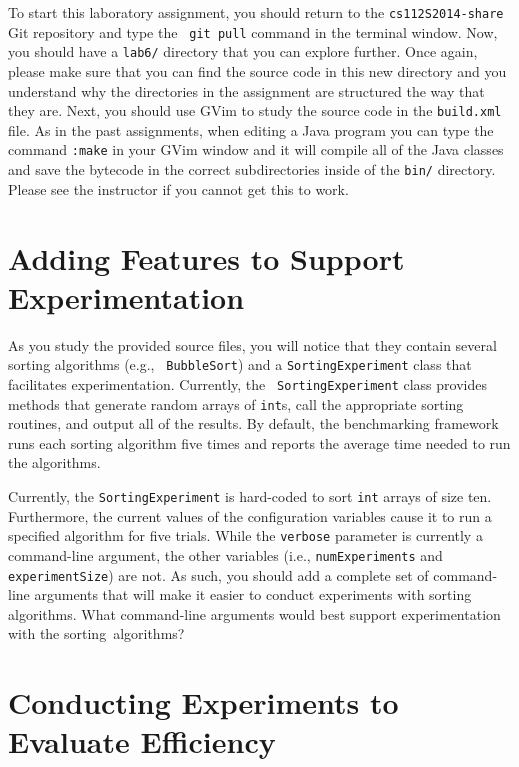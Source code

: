 To start this laboratory assignment, you should return to the {\tt cs112S2014-share} Git repository and type the {\tt
git pull} command in the terminal window.  Now, you should have a {\tt lab6/} directory that you can explore further.
Once again, please make sure that you can find the source code in this new directory and you understand why the
directories in the assignment are structured the way that they are. Next, you should use GVim to study the source code in
the {\tt build.xml} file.  As in the past assignments, when editing a Java program you can type the command {\tt :make}
in your GVim window and it will compile all of the Java classes and save the bytecode in the correct subdirectories
inside of the {\tt bin/} directory.  Please see the instructor if you cannot get this to work.

\section*{Adding Features to Support Experimentation}

As you study the provided source files, you will notice that they contain several sorting algorithms (e.g., {\tt
  BubbleSort}) and a {\tt SortingExperiment} class that facilitates experimentation. Currently, the {\tt
  SortingExperiment} class provides methods that generate random arrays of {\tt int}s, call the appropriate sorting
routines, and output all of the results.  By default, the benchmarking framework runs each sorting algorithm five times
and reports the average time needed to run the algorithms.

Currently, the {\tt SortingExperiment} is hard-coded to sort {\tt int} arrays of size ten. Furthermore, the current
values of the configuration variables cause it to run a specified algorithm for five trials.  While the {\tt verbose}
parameter is currently a command-line argument, the other variables (i.e., {\tt numExperiments} and {\tt
  experimentSize}) are not.  As such, you should add a complete set of command-line arguments that will make it easier
to conduct experiments with sorting algorithms. What command-line arguments would best support experimentation with 
the \mbox{sorting algorithms}?

\section*{Conducting Experiments to Evaluate Efficiency}

